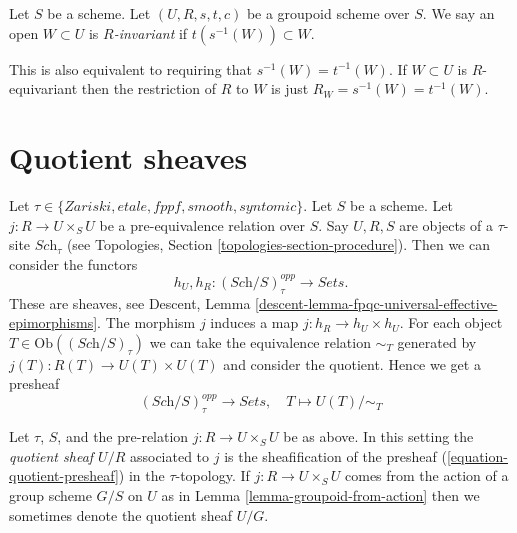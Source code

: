 \begin{definition}
\label{definition-invariant-open}
Let $S$ be a scheme.
Let $(U, R, s, t, c)$ be a groupoid scheme over $S$.
We say an open $W \subset U$ is {\it $R$-invariant} if
$t(s^{-1}(W)) \subset W$.
\end{definition}

\noindent
This is also equivalent to requiring that $s^{-1}(W) = t^{-1}(W)$.
If $W \subset U$ is $R$-equivariant then the restriction of $R$ to
$W$ is just $R_W = s^{-1}(W) = t^{-1}(W)$.










\section{Quotient sheaves}
\label{section-quotient-sheaves}

\noindent
Let $\tau \in \{Zariski, etale, fppf, smooth, syntomic\}$.
Let $S$ be a scheme.
Let $j : R \to U\times_S U$ be a pre-equivalence relation over $S$.
Say $U, R, S$ are objects of a $\tau$-site $\textit{Sch}_\tau$
(see Topologies, Section \ref{topologies-section-procedure}).
Then we can consider the functors
$$
h_U, h_R :
(\textit{Sch}/S)_\tau^{opp}
\longrightarrow
\textit{Sets}.
$$
These are sheaves, see
Descent, Lemma \ref{descent-lemma-fpqc-universal-effective-epimorphisms}.
The morphism $j$ induces a map $j : h_R \to h_U \times h_U$.
For each object $T \in \text{Ob}((\textit{Sch}/S)_\tau)$
we can take the equivalence relation $\sim_T$ generated by
$j(T) : R(T) \to U(T) \times U(T)$ and consider the quotient.
Hence we get a presheaf
\begin{equation}
\label{equation-quotient-presheaf}
(\textit{Sch}/S)_\tau^{opp}
\longrightarrow
\textit{Sets},\quad
T \longmapsto U(T)/\sim_T
\end{equation}

\begin{definition}
\label{definition-quotient-sheaf}
Let $\tau$, $S$, and the pre-relation $j : R \to U \times_S U$ be as above.
In this setting the {\it quotient sheaf $U/R$} associated
to $j$ is the sheafification of the presheaf
(\ref{equation-quotient-presheaf}) in the $\tau$-topology.
If $j : R \to U \times_S U$ comes from the action of a group scheme
$G/S$ on $U$ as in Lemma \ref{lemma-groupoid-from-action} then we
sometimes denote the quotient sheaf $U/G$.
\end{definition}

